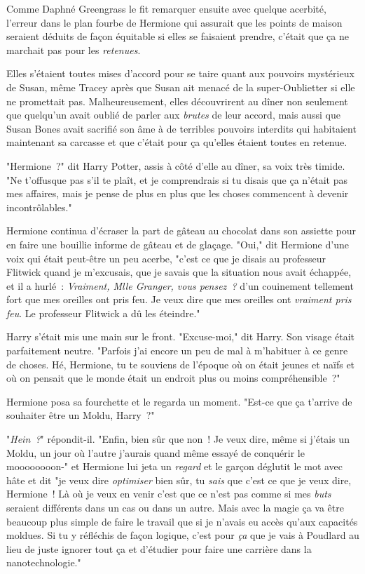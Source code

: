 \later

Comme Daphné Greengrass le fit remarquer ensuite avec quelque acerbité, l'erreur dans le plan fourbe de Hermione qui assurait que les points de maison seraient déduits de façon équitable si elles se faisaient prendre, c'était que ça ne marchait pas pour les \emph{retenues}.

Elles s'étaient toutes mises d'accord pour se taire quant aux pouvoirs mystérieux de Susan, même Tracey après que Susan ait menacé de la super-Oublietter si elle ne promettait pas. Malheureusement, elles découvrirent au dîner non seulement que quelqu'un avait oublié de parler aux \emph{brutes} de leur accord, mais aussi que Susan Bones avait sacrifié son âme à de terribles pouvoirs interdits qui habitaient maintenant sa carcasse et que c'était pour ça qu'elles étaient toutes en retenue.

"Hermione~?" dit Harry Potter, assis à côté d'elle au dîner, sa voix très timide. "Ne t'offusque pas s'il te plaît, et je comprendrais si tu disais que ça n'était pas mes affaires, mais je pense de plus en plus que les choses commencent à devenir incontrôlables."

Hermione continua d'écraser la part de gâteau au chocolat dans son assiette pour en faire une bouillie informe de gâteau et de glaçage. "Oui," dit Hermione d'une voix qui était peut-être un peu acerbe, "c'est ce que je disais au professeur Flitwick quand je m'excusais, que je savais que la situation nous avait échappée, et il a hurlé~: \emph{Vraiment, Mlle Granger, vous pensez~?} d'un couinement tellement fort que mes oreilles ont pris feu. Je veux dire que mes oreilles ont \emph{vraiment pris feu}. Le professeur Flitwick a dû les éteindre."

Harry s'était mis une main sur le front. "Excuse-moi," dit Harry. Son visage était parfaitement neutre. "Parfois j'ai encore un peu de mal à m'habituer à ce genre de choses. Hé, Hermione, tu te souviens de l'époque où on était jeunes et naïfs et où on pensait que le monde était un endroit plus ou moins compréhensible~?"

Hermione posa sa fourchette et le regarda un moment. "Est-ce que ça t'arrive de souhaiter être un Moldu, Harry~?"

"\emph{Hein~?}" répondit-il. "Enfin, bien sûr que non~! Je veux dire, même si j'étais un Moldu, un jour où l'autre j'aurais quand même essayé de conquérir le moooooooon-" et Hermione lui jeta un \emph{regard} et le garçon déglutit le mot avec hâte et dit "je veux dire \emph{optimiser} bien sûr, tu \emph{sais} que c'est ce que je veux dire, Hermione~! Là où je veux en venir c'est que ce n'est pas comme si mes \emph{buts} seraient différents dans un cas ou dans un autre. Mais avec la magie ça va être beaucoup plus simple de faire le travail que si je n'avais eu accès qu'aux capacités moldues. Si tu y réfléchis de façon logique, c'est pour \emph{ça} que je vais à Poudlard au lieu de juste ignorer tout ça et d'étudier pour faire une carrière dans la nanotechnologie."

